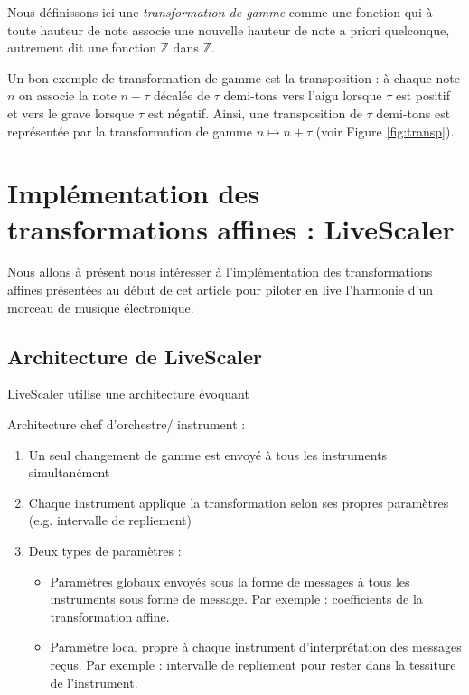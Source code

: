 \documentclass[french,11pt]{article}
\begin{document}
Nous définissons ici une \emph{transformation de gamme} comme une fonction qui à toute hauteur de note associe une nouvelle hauteur de note a priori quelconque, autrement dit une fonction $\mathbb{Z}$ dans $\mathbb{Z}$.

Un bon exemple de transformation de gamme est la transposition : à chaque note $n$ on associe la note $n+\tau$  décalée de $\tau$ demi-tons vers l'aigu lorsque $\tau$ est positif et vers le grave lorsque $\tau$ est négatif. Ainsi, une transposition de $\tau$ demi-tons est représentée par la transformation de gamme $ n \mapsto n+\tau$ (voir Figure \ref{fig:transp}).










\section{Implémentation des transformations affines : LiveScaler}
Nous allons à présent nous intéresser à l'implémentation des transformations affines présentées au début de cet article pour piloter en live l'harmonie d'un morceau de musique électronique. 

\subsection{Architecture de LiveScaler}
LiveScaler utilise une architecture évoquant

Architecture chef d'orchestre/ instrument : 
\begin{enumerate}
  \item Un seul changement de gamme est envoyé à tous les instruments simultanément
  \item Chaque instrument applique la transformation selon ses propres paramètres (e.g. intervalle de repliement)
  \item Deux types de paramètres : \begin{itemize}
    \item Paramètres globaux envoyés sous la forme de messages à tous les instruments sous forme de message. Par exemple : coefficients de la transformation affine.
    \item Paramètre local propre à chaque instrument d'interprétation des messages reçus. Par exemple : intervalle de repliement pour rester dans la tessiture de l'instrument.
    \end{itemize}
\end{enumerate}
\end{document}
